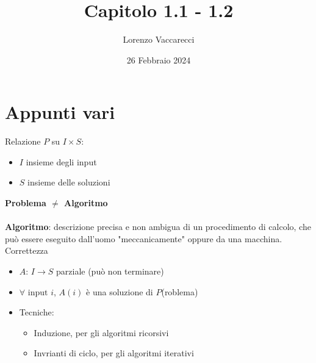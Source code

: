 \documentclass[12pt]{article}
\title{Capitolo 1.1 - 1.2}
\author{Lorenzo Vaccarecci}
\date{26 Febbraio 2024}
\begin{document}
\maketitle
\section{Appunti vari}
Relazione \(P\) su \(I\times S\):
\begin{itemize}
    \setlength\itemsep{0em} 
    \item \(I\) insieme degli input
    \item \(S\) insieme delle soluzioni
\end{itemize}
\textbf{Problema \(\neq\) Algoritmo}
\\\\\textbf{Algoritmo}: descrizione precisa e non ambigua di un procedimento di calcolo, che può essere eseguito dall'uomo "meccanicamente" oppure da una macchina.
\\ Correttezza
\begin{itemize}
    \setlength\itemsep{0em}
    \item \(A\): \(I\rightarrow S\) parziale (può non terminare)
    \item \(\forall \text{ input } i\), \(A(i)\) è una soluzione di \(P\)(roblema)
    \item Tecniche:
    \begin{itemize}
        \item Induzione, per gli algoritmi ricorsivi
        \item Invrianti di ciclo, per gli algoritmi iterativi
    \end{itemize}
\end{itemize}
\end{document}

